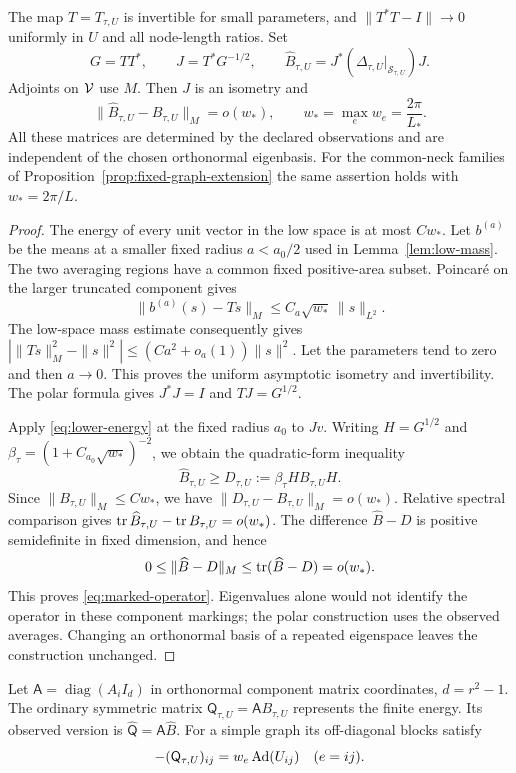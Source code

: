 \begin{lemma}\label{lem:marked-operator}
The map $T=T_{\tau,U}$ is invertible for
small parameters, and
$\|T^*T-I\|\to0$ uniformly in $U$ and
all node-length ratios. Set
\[
 G=TT^*,\qquad J=T^*G^{-1/2},\qquad
 \widehat B_{\tau,U}
       =J^*(\Delta_{\tau,U}|_{\mathcal S_{\tau,U}})J .
\]
Adjoints on $\mathcal V$ use $M$.
Then $J$ is an isometry and
\begin{equation}\label{eq:marked-operator}
 \|\widehat B_{\tau,U}-B_{\tau,U}\|_M=o(w_*),
 \qquad w_*=\max_e w_e=\frac{2\pi}{L_*}.
\end{equation}
All these matrices are determined by the
declared observations and are independent
of the chosen orthonormal eigenbasis.
For the common-neck families of
Proposition~\ref{prop:fixed-graph-extension}
the same assertion holds with
$w_*=2\pi/L$.
\end{lemma}
\begin{proof}
The energy of every unit vector in the
low space is at most $Cw_*$.
Let $b^{(a)}$ be the means at a smaller
fixed radius $a<a_0/2$ used in
Lemma~\ref{lem:low-mass}.
The two averaging regions have a common
fixed positive-area subset. Poincaré on
the larger truncated component gives
\[
 \|b^{(a)}(s)-Ts\|_M\le C_a\sqrt{w_*}\,\|s\|_{L^2}.
\]
The low-space mass estimate consequently
gives
$|\|Ts\|_M^2-\|s\|^2|
\le(Ca^2+o_a(1))\|s\|^2$.
Let the parameters tend to zero and then
$a\to0$. This proves the uniform
asymptotic isometry and invertibility.
The polar formula gives $J^*J=I$ and
$TJ=G^{1/2}$.

Apply \eqref{eq:lower-energy} at the
fixed radius $a_0$ to $Jv$.
Writing $H=G^{1/2}$ and
$\beta_\tau=(1+C_{a_0}\sqrt{w_*})^{-2}$,
we obtain the quadratic-form inequality
\[
 \widehat B_{\tau,U}
       \ge D_{\tau,U}:=\beta_\tau H B_{\tau,U}H .
\]
Since $\|B_{\tau,U}\|_M\le Cw_*$,
we have $\|D_{\tau,U}-B_{\tau,U}\|_M=o(w_*)$.
Relative spectral comparison gives
$\operatorname{tr}\widehat B_{\tau,U}-\operatorname{tr} B_{\tau,U}=o(w_*)$.
The difference $\widehat B-D$ is
positive semidefinite in fixed dimension,
and hence
\[
 0\le\|\widehat B-D\|_M
       \le\operatorname{tr}(\widehat B-D)=o(w_*).
\]
This proves \eqref{eq:marked-operator}.
Eigenvalues alone would not identify the
operator in these component markings;
the polar construction uses the observed
averages. Changing an orthonormal basis
of a repeated eigenspace leaves the
construction unchanged.
\end{proof}

Let $\mathsf A=\operatorname{diag}(A_iI_d)$
in orthonormal component matrix coordinates,
$d=r^2-1$. The ordinary symmetric matrix
$\mathsf Q_{\tau,U}=\mathsf A B_{\tau,U}$
represents the finite energy. Its observed
version is $\widehat{\mathsf Q}=\mathsf A\widehat B$.
For a simple graph its off-diagonal blocks
satisfy
\begin{equation}\label{eq:offdiag-inverse}
 -(\mathsf Q_{\tau,U})_{ij}
       =w_e\operatorname{Ad}(U_{ij})\quad(e=ij).
\end{equation}

